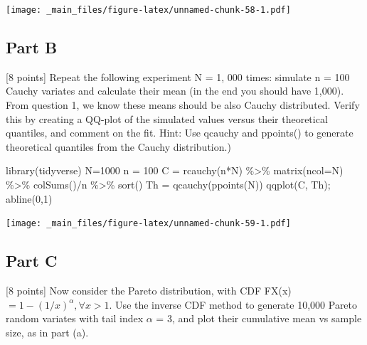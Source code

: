 \documentclass[
  oneside]{book}
\newenvironment{Shaded}{\begin{snugshade}}{\end{snugshade}}
\newcommand{\AttributeTok}[1]{\textcolor[rgb]{0.77,0.63,0.00}{#1}}
\newcommand{\DecValTok}[1]{\textcolor[rgb]{0.00,0.00,0.81}{#1}}
\newcommand{\FunctionTok}[1]{\textcolor[rgb]{0.00,0.00,0.00}{#1}}
\newcommand{\NormalTok}[1]{#1}
\newcommand{\OtherTok}[1]{\textcolor[rgb]{0.56,0.35,0.01}{#1}}
\newcommand{\SpecialCharTok}[1]{\textcolor[rgb]{0.00,0.00,0.00}{#1}}
\begin{document}
\texttt{[image: \_main\_files/figure-latex/unnamed-chunk-58-1.pdf]}

\hypertarget{part-b-14}{%
\subsection{Part B}\label{part-b-14}}

{[}8 points{]} Repeat the following experiment N = 1, 000 times: simulate n = 100 Cauchy variates and calculate their mean (in the end you should have 1,000). From question 1, we know these means should be also Cauchy distributed. Verify this by creating a QQ-plot of the simulated values versus their theoretical quantiles, and comment on the fit. Hint: Use qcauchy and ppoints() to generate theoretical quantiles from the Cauchy distribution.)

\begin{Shaded}
\begin{Highlighting}[]
\FunctionTok{library}\NormalTok{(tidyverse)}
\NormalTok{N}\OtherTok{=}\DecValTok{1000}
\NormalTok{n }\OtherTok{=} \DecValTok{100}
\NormalTok{C }\OtherTok{=} \FunctionTok{rcauchy}\NormalTok{(n}\SpecialCharTok{*}\NormalTok{N) }\SpecialCharTok{\%\textgreater{}\%} \FunctionTok{matrix}\NormalTok{(}\AttributeTok{ncol=}\NormalTok{N) }\SpecialCharTok{\%\textgreater{}\%} \FunctionTok{colSums}\NormalTok{()}\SpecialCharTok{/}\NormalTok{n }\SpecialCharTok{\%\textgreater{}\%} \FunctionTok{sort}\NormalTok{()}
\NormalTok{Th }\OtherTok{=} \FunctionTok{qcauchy}\NormalTok{(}\FunctionTok{ppoints}\NormalTok{(N))}
\FunctionTok{qqplot}\NormalTok{(C, Th); }\FunctionTok{abline}\NormalTok{(}\DecValTok{0}\NormalTok{,}\DecValTok{1}\NormalTok{)}
\end{Highlighting}
\end{Shaded}

\texttt{[image: \_main\_files/figure-latex/unnamed-chunk-59-1.pdf]}

\hypertarget{part-c-7}{%
\subsection{Part C}\label{part-c-7}}

{[}8 points{]} Now consider the Pareto distribution, with CDF FX(x) \(= 1 − (1/x)^\alpha, \forall x > 1\). Use the inverse CDF method to generate 10,000 Pareto random variates with tail index \(\alpha\) = 3, and plot their cumulative mean vs sample size, as in part (a).
\end{document}
